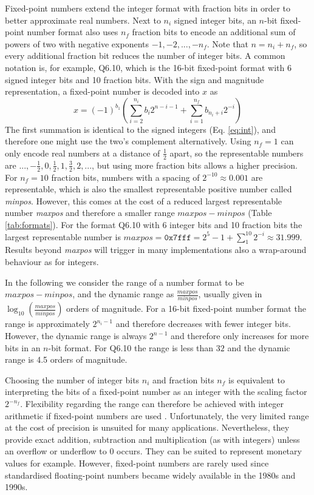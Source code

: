 Fixed-point numbers extend the integer format with fraction bits in order to better approximate real numbers. 
Next to $n_i$ signed integer bits, an $n$-bit fixed-point number format also uses $n_f$ fraction bits to encode 
an additional sum of powers of two with negative exponents $-1,-2,...,-n_f$. Note that $n = n_i + n_f$, so
every additional fraction bit reduces the number of integer bits. A common notation is, for example,
Q6.10, which is the 16-bit fixed-point format with 6 signed integer bits and 10 fraction bits.
With the sign and magnitude representation, a fixed-point number is decoded into $x$ as
\begin{equation}
x = (-1)^{b_1} \left( \sum_{i=2}^{n_i} b_i 2^{n-i-1}  + \sum_{i=1}^{n_f} b_{n_i+i} 2^{-i} \right)
\label{eq:fixpoints}
\end{equation}
The first summation is identical to the signed integers (Eq. \ref{eq:int}), and therefore one might use the two's complement
alternatively. Using $n_f = 1$ can only encode real numbers at a distance of $\tfrac{1}{2}$ apart, so the representable
numbers are $..., -\tfrac{1}{2}, 0,\tfrac{1}{2},1,\tfrac{3}{2},2,...$, but using more fraction bits allows a higher precision.
For $n_f=10$ fraction bits, numbers with a spacing of $2^{-10} \approx 0.001$ are representable,
which is also the smallest representable positive number called \emph{minpos}. However, this comes at the cost of a reduced
largest representable number \emph{maxpos} and therefore a smaller range $maxpos-minpos$ (Table \ref{tab:formats}).
For the format Q6.10 with 6 integer bits and 10 fraction bits the largest representable number is $maxpos = \mathtt{0x7fff} = 2^5-1 + \sum_1^{10} 2^{-i}
\approx 31.999$. Results beyond \emph{maxpos} will trigger in many implementations also a wrap-around behaviour as for integers.

In the following we consider the range of a number format to be $maxpos-minpos$, and the dynamic range as
$\tfrac{maxpos}{minpos}$, usually given in $\log_{10}(\tfrac{maxpos}{minpos})$ orders of magnitude. For a 16-bit fixed-point
number format the range is approximately $2^{n_i-1}$ and therefore decreases with fewer integer bits.
However, the dynamic range is always $2^{n-1}$ and therefore only increases for more bits in an $n$-bit format. For Q6.10
the range is less than $32$ and the dynamic range is 4.5 orders of magnitude.

Choosing the number of integer bits $n_i$ and fraction bits $n_f$ is equivalent to interpreting the bits of a fixed-point number
as an integer with the scaling factor $2^{-n_f}$. Flexibility regarding the range can therefore be achieved with
integer arithmetic if fixed-point numbers are used \citep{Russell2017}. Unfortunately, the very limited range at the cost of precision 
is unsuited for many applications. Nevertheless, they provide exact addition, subtraction and multiplication (as with integers) unless an
overflow or underflow to 0 occurs. They can be suited to represent monetary values for example. However, fixed-point numbers
are rarely used since standardised floating-point numbers became widely available in the 1980s and 1990s.

